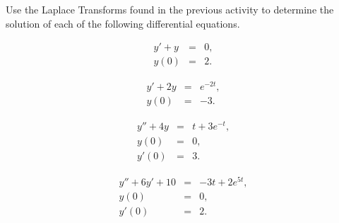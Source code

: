 \begin{problem}

\item Use the Laplace Transforms found in the previous activity to
  determine the solution of each of the following differential
  equations.

  \begin{subproblem}
  \item 
    \begin{eqnarray}
      y' + y & = & 0, \\
      y(0) & = & 2.
    \end{eqnarray}
    \vfill

  \item 
    \begin{eqnarray}
      y' + 2y & = & e^{-2t}, \\
      y(0) & = & -3.
    \end{eqnarray}
    \vfill

    \clearpage

  \item 
    \begin{eqnarray}
      y'' + 4y & = & t + 3e^{-t}, \\
      y(0) & = & 0, \\
      y'(0) & = & 3.
    \end{eqnarray}
    \vfill

  \item 
    \begin{eqnarray}
      y'' + 6y' + 10 & = & -3t + 2e^{5t}, \\
      y(0) & = & 0, \\
      y'(0) & = & 2.
    \end{eqnarray}
    \vfill


  \end{subproblem}


\end{problem}





